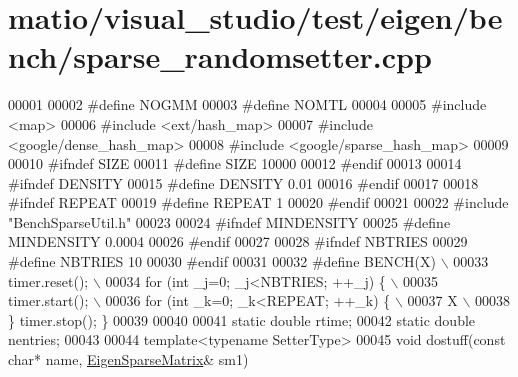 \hypertarget{matio_2visual__studio_2test_2eigen_2bench_2sparse__randomsetter_8cpp_source}{}\section{matio/visual\+\_\+studio/test/eigen/bench/sparse\+\_\+randomsetter.cpp}
\label{matio_2visual__studio_2test_2eigen_2bench_2sparse__randomsetter_8cpp_source}

\begin{DoxyCode}
00001 
00002 \textcolor{preprocessor}{#define NOGMM}
00003 \textcolor{preprocessor}{#define NOMTL}
00004 
00005 \textcolor{preprocessor}{#include <map>}
00006 \textcolor{preprocessor}{#include <ext/hash\_map>}
00007 \textcolor{preprocessor}{#include <google/dense\_hash\_map>}
00008 \textcolor{preprocessor}{#include <google/sparse\_hash\_map>}
00009 
00010 \textcolor{preprocessor}{#ifndef SIZE}
00011 \textcolor{preprocessor}{#define SIZE 10000}
00012 \textcolor{preprocessor}{#endif}
00013 
00014 \textcolor{preprocessor}{#ifndef DENSITY}
00015 \textcolor{preprocessor}{#define DENSITY 0.01}
00016 \textcolor{preprocessor}{#endif}
00017 
00018 \textcolor{preprocessor}{#ifndef REPEAT}
00019 \textcolor{preprocessor}{#define REPEAT 1}
00020 \textcolor{preprocessor}{#endif}
00021 
00022 \textcolor{preprocessor}{#include "BenchSparseUtil.h"}
00023 
00024 \textcolor{preprocessor}{#ifndef MINDENSITY}
00025 \textcolor{preprocessor}{#define MINDENSITY 0.0004}
00026 \textcolor{preprocessor}{#endif}
00027 
00028 \textcolor{preprocessor}{#ifndef NBTRIES}
00029 \textcolor{preprocessor}{#define NBTRIES 10}
00030 \textcolor{preprocessor}{#endif}
00031 
00032 \textcolor{preprocessor}{#define BENCH(X) \(\backslash\)}
00033 \textcolor{preprocessor}{  timer.reset(); \(\backslash\)}
00034 \textcolor{preprocessor}{  for (int \_j=0; \_j<NBTRIES; ++\_j) \{ \(\backslash\)}
00035 \textcolor{preprocessor}{    timer.start(); \(\backslash\)}
00036 \textcolor{preprocessor}{    for (int \_k=0; \_k<REPEAT; ++\_k) \{ \(\backslash\)}
00037 \textcolor{preprocessor}{        X  \(\backslash\)}
00038 \textcolor{preprocessor}{  \} timer.stop(); \}}
00039 
00040 
00041 \textcolor{keyword}{static} \textcolor{keywordtype}{double} rtime;
00042 \textcolor{keyword}{static} \textcolor{keywordtype}{double} nentries;
00043 
00044 \textcolor{keyword}{template}<\textcolor{keyword}{typename} SetterType>
00045 \textcolor{keywordtype}{void} dostuff(\textcolor{keyword}{const} \textcolor{keywordtype}{char}* name, \hyperlink{group___sparse_core___module}{EigenSparseMatrix}& sm1)

\end{DoxyCode}
